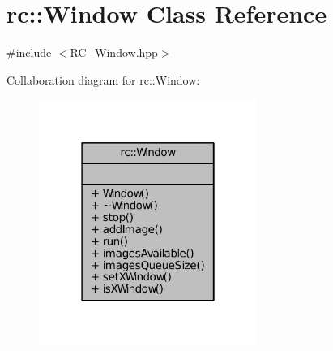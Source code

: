 \hypertarget{classrc_1_1Window}{\section{rc\+:\+:Window Class Reference}
\label{classrc_1_1Window}
}


{\ttfamily \#include $<$R\+C\+\_\+\+Window.\+hpp$>$}



Collaboration diagram for rc\+:\+:Window\+:\nopagebreak
\begin{figure}[H]
\begin{center}
\leavevmode
\includegraphics[width=202pt]{classrc_1_1Window__coll__graph}
\end{center}
\end{figure}
